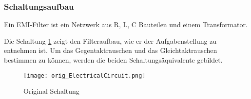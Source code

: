 \subsubsection{Schaltungsaufbau} \label{subsubsec:schaltungsaufbau}
Ein EMI-Filter ist ein Netzwerk aus R, L, C Bauteilen und einem Transformator. 

Die Schaltung \ref{fig:orig_Schaltung}  zeigt den Filteraufbau, wie er der Aufgabenstellung zu entnehmen ist. Um das Gegentaktrauschen und das Gleichtaktrauschen bestimmen zu können, werden die beiden Schaltungsäquivalente gebildet. 
\begin{figure}[H]
	\centering
	\texttt{[image: orig\_ElectricalCircuit.png]}
	\caption{Original Schaltung \cite{aufgabenstellung}}
	\label{fig:orig_Schaltung}
\end{figure}


